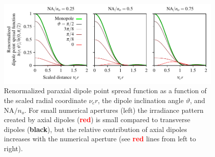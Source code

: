 \documentclass[]{osa-article}
\begin{document}
\begin{figure}[h]
 \centering
   \centering
   \includegraphics[scale=0.8]{../figures/paratfs/dpsf.pdf}
   \caption{Renormalized paraxial dipole point spread function as a function of
     the scaled radial coordinate $\nu_c r$, the dipole inclination angle
     $\vartheta$, and $\text{NA}/n_o$. For small numerical apertures (left) the
     irradiance pattern created by axial dipoles (\textcolor{red}{\textbf{red}})
     is small compared to transverse dipoles (\textbf{black}), but the relative
     contribution of axial dipoles increases with the numerical aperture (see
     \textcolor{red}{\textbf{red}} lines from left to right).}
   \label{fig:hdet}
 \end{figure}
 
\end{document}
